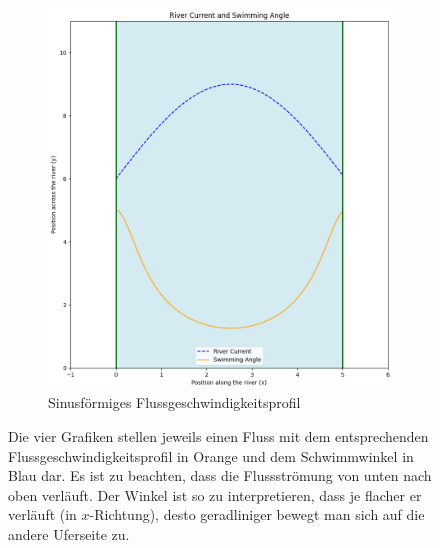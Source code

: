 \begin{figure}
\begin{subfigure}{0.48\textwidth}
        \includegraphics[width=\textwidth]{Grafiken/sin-crop.png}	
        \caption{Sinusförmiges Flussgeschwindigkeitsprofil}
        \label{fig:sin_velocity}
    \end{subfigure}
    \par\bigskip
    \caption{Die vier Grafiken stellen jeweils einen Fluss mit dem entsprechenden Flussgeschwindigkeitsprofil in Orange und dem Schwimmwinkel in Blau dar. Es ist zu beachten, dass die Flussströmung von unten nach oben verläuft. Der Winkel ist so zu interpretieren, dass je flacher er verläuft (in \(x\)-Richtung), desto geradliniger bewegt man sich auf die andere Uferseite zu.}
    \label{fig:river_pfrofiles}
\end{figure}




















